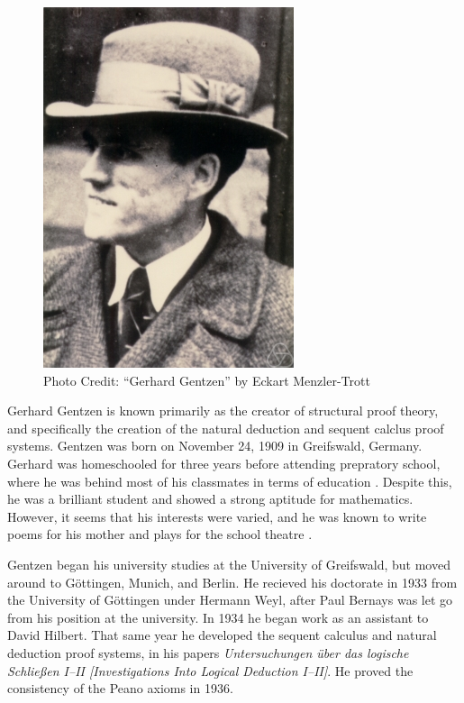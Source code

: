 \documentclass[../../../include/open-logic-section]{subfiles}
\begin{document}


\begin{figure}[h!] 
\centering
\includegraphics[scale=0.55]{gerhard-gentzen.jpg} 
\caption{Photo Credit: ``Gerhard Gentzen'' by Eckart Menzler-Trott}
\end{figure}

Gerhard Gentzen is known primarily as the creator of structural proof
theory, and specifically the creation of the natural deduction and 
sequent calclus proof systems. Gentzen was born on November 24, 1909 in 
Greifswald, Germany. Gerhard was homeschooled for three years before 
attending prepratory school, where he was behind most of his classmates in
 terms of education \citep[12]{Menzler-Trott2007}. Despite this, he was a
 brilliant student and showed a strong aptitude for mathematics. However,
it seems that his interests were varied, and he was known to write poems for 
his mother and plays for the school theatre \citep[11, 13]{Menzler-Trott2007}.

Gentzen began his university studies at the University of Greifswald, but
moved around to G\"{o}ttingen, Munich, and Berlin. He recieved his
doctorate in 1933 from the University of G\"{o}ttingen under Hermann Weyl,
after Paul Bernays was let go from his position at the university.
In 1934 he began work as an assistant to David Hilbert. That same year he
developed the sequent calculus and natural deduction proof systems, in his
papers \emph{Untersuchungen \"{u}ber das logische Schlie\ss en
I--II [Investigations Into Logical Deduction I--II]}. He proved the consistency
 of the Peano axioms in 1936.
\end{document}
